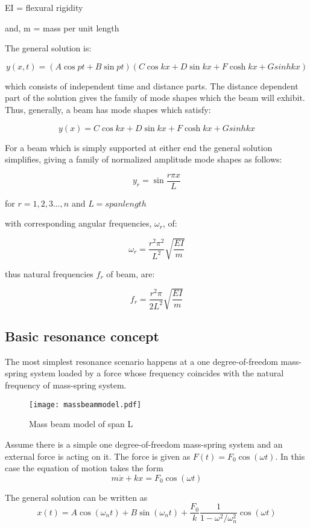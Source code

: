 EI = flexural rigidity

and, m = mass per unit length

The general solution is:

$$y(x,t) = (A\cos pt+B\sin pt)(C\cos kx + D\sin kx + F\cosh kx + Gsinh kx)$$

which consists of independent time and distance parts. The distance dependent part of the solution gives the family of mode shapes which the beam will exhibit. Thus, generally, a beam has mode shapes which satisfy:

$$y(x) = C\cos kx + D\sin kx + F\cosh kx + Gsinh kx $$

For a beam which is simply supported at either end the general solution simplifies, giving a family of normalized amplitude mode shapes as follows:

$$y_r = \sin \frac{r\pi x}{L}$$

for $r = 1,2,3...,n$ and $L = span length$

with corresponding angular frequencies, $\omega_r$, of:

$$\omega_r = \frac{r^2 \pi^2}{L^2}\sqrt{\frac{EI}{m}}$$

thus natural frequencies $f_r$ of beam, are:

$$f_r = \frac{r^2 \pi}{2L^2}\sqrt{\frac{EI}{m}}$$

\subsection{Basic resonance concept}
The most simplest resonance scenario happens at a one degree-of-freedom mass-spring system loaded by a force whose frequency coincides with the natural frequency of mass-spring system.
\begin{figure}[h]
	\centering
	\texttt{[image: massbeammodel.pdf]}
	\caption{Mass beam model of span L}
	\label{fig:massbeammodel}
\end{figure}

Assume there is a simple one degree-of-freedom mass-spring system and an external force is acting on it. The force is given as $F(t)= F_0 \cos(\omega t)$. In this case the equation of motion takes the form
\begin{equation}
	m\ddot{x} + kx = F_0 \cos(\omega t)
\end{equation}

The general solution can be written as
\begin{equation}
	x(t) = A\cos(\omega_n t)+B\sin(\omega_n t) +\frac{F_0}{k}\frac{1}{1-\omega^2/\omega_n^2}\cos(\omega t)
\end{equation}

